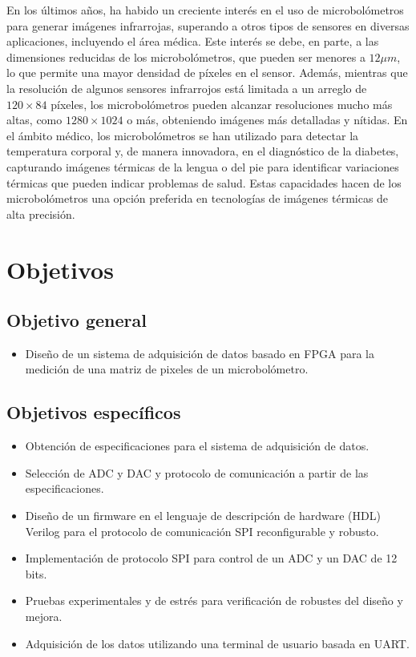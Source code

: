 En los últimos años, ha habido un creciente interés en el uso de microbolómetros para generar imágenes infrarrojas, superando a otros tipos de sensores en diversas aplicaciones, incluyendo el área médica. Este interés se debe, en parte, a las dimensiones reducidas de los microbolómetros, que pueden ser menores a $12\mu m$, lo que permite una mayor densidad de píxeles en el sensor. Además, mientras que la resolución de algunos sensores infrarrojos está limitada a un arreglo de $120\times 84$ píxeles, los microbolómetros pueden alcanzar resoluciones mucho más altas, como $1280\times 1024$ o más, obteniendo imágenes más detalladas y nítidas. En el ámbito médico, los microbolómetros se han utilizado para detectar la temperatura corporal \cite{Svantner2022} y, de manera innovadora, en el diagnóstico de la diabetes, capturando imágenes térmicas de la lengua \cite{WziatekKuczmik2024} o del pie \cite{Rocha2022} para identificar variaciones térmicas que pueden indicar problemas de salud. Estas capacidades hacen de los microbolómetros una opción preferida en tecnologías de imágenes térmicas de alta precisión.
		 					          
		
    \section{Objetivos}
	
		\subsection{Objetivo general}
			\begin{itemize}
				\item Diseño de un sistema de adquisición de datos basado en FPGA para la medición de una matriz de pixeles de un microbolómetro.
			\end{itemize}
		
		\subsection{Objetivos específicos}
			\begin{itemize}
                \item Obtención de especificaciones para el sistema de adquisición de datos.
                \item Selección de ADC y DAC y protocolo de comunicación a partir de las especificaciones.
                \item Diseño de un firmware en el lenguaje de descripción de hardware (HDL) Verilog para el protocolo de comunicación SPI reconfigurable y robusto.
                \item Implementación de protocolo SPI para control de un ADC y un DAC de 12 bits.
                \item Pruebas experimentales y de estrés para verificación de robustes del diseño y mejora.
                \item Adquisición de los datos utilizando una terminal de usuario basada en UART.
			\end{itemize}
